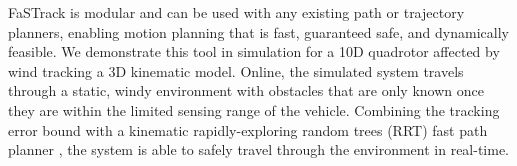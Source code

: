 

  

%
FaSTrack is modular and can be used with any existing path or trajectory planners, enabling motion planning that is fast, guaranteed safe, and dynamically feasible. We demonstrate this tool in simulation for a 10D quadrotor affected by wind tracking a 3D kinematic model. Online, the simulated system travels through a static, windy environment with obstacles that are only known once they are within the limited sensing range of the vehicle. Combining the tracking error bound with a kinematic rapidly-exploring random trees (RRT) fast path planner \cite{Kuffner2000, Kavraki1996}, the system is able to safely travel through the environment in real-time.
